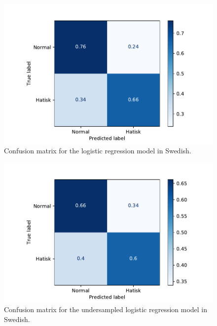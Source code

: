 \documentclass[nofilelist]{cslthse-msc}
\begin{document}
\begin{figure}[t]
    \centering
    \includegraphics[width=\textwidth*3/4]{tfidf.pdf}
    \caption{Confusion matrix for the logistic regression model in Swedish.}
    \label{fig:tfidf}
\end{figure}

\begin{figure}[t]
    \centering
    \includegraphics[width=\textwidth*3/4]{undersampledtfidf.pdf}
    \caption{Confusion matrix for the undersampled logistic regression model in Swedish.}
    \label{fig:undertfidf}
\end{figure}

\end{document}
